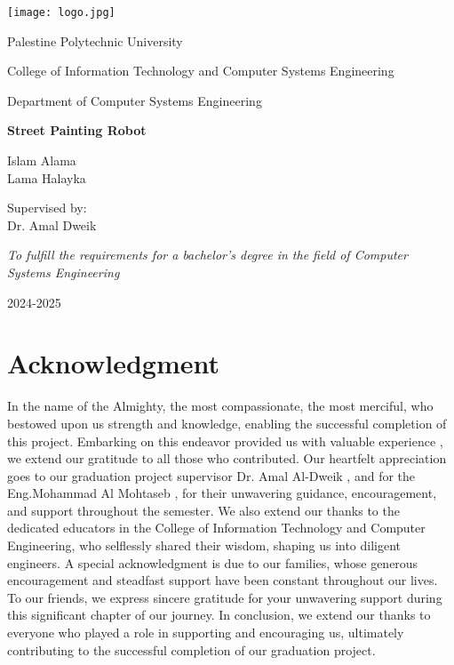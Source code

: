 \documentclass[oneside]{book}
\begin{document}
\begin{titlepage}
  
    \centering
    \texttt{[image: logo.jpg]}
    
    \vspace{0.5cm} %
    \Large{Palestine Polytechnic University}
    
    \Large{College of Information Technology and Computer Systems Engineering}
    
    \Large{Department of Computer Systems Engineering}

    \vspace{1cm}
    \Huge\textbf{Street Painting Robot}
    
    \vspace{1cm}
    
    \Large
    {Islam Alama \\
    Lama Halayka}

    \vspace{0.5cm}

    \Large
    {Supervised by: \\
    Dr. Amal Dweik}

    \vspace{3cm}
    
    \emph{To fulfill the requirements for a bachelor's degree in the field of Computer Systems Engineering}
    
    \vfill
    
    \large{2024-2025}
\end{titlepage}

\thispagestyle{empty}
\chapter*{Acknowledgment}
In the name of the Almighty, the most compassionate, the most merciful, who bestowed upon us strength and knowledge, enabling the successful completion of this project. Embarking on this endeavor provided us with valuable experience , we extend our gratitude to all those who contributed. Our heartfelt appreciation goes to our graduation project supervisor Dr. Amal Al-Dweik , and for the Eng.Mohammad Al Mohtaseb , for their unwavering guidance, encouragement, and support throughout the semester. We also extend our thanks to the dedicated educators in the College of Information Technology and Computer Engineering, who selflessly shared their wisdom, shaping us into diligent engineers. A special acknowledgment is due to our families, whose generous encouragement and steadfast support have been constant throughout our lives. To our friends, we express sincere gratitude for your unwavering support during this significant chapter of our journey. In conclusion, we extend our thanks to everyone who played a role in supporting and encouraging us, ultimately contributing to the successful completion of our graduation project.
\thispagestyle{empty}
\clearpage
\frontmatter %
\end{document}

